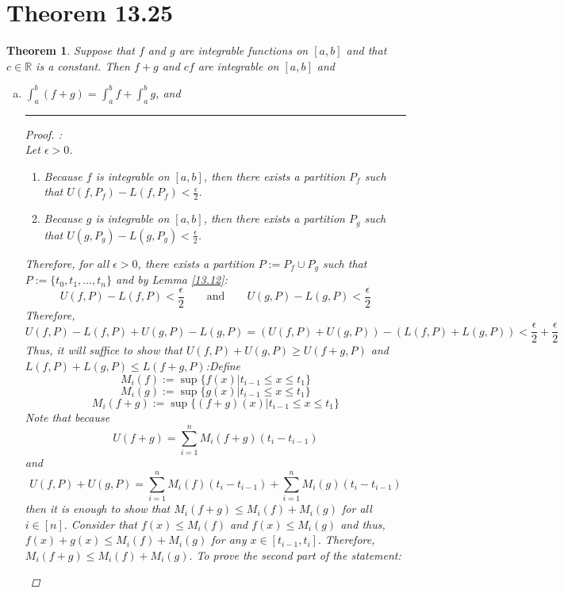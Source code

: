 \documentclass[openany, amssymb, psamsfonts]{amsart}
\newcommand{\bbR}{\mathbb{R}}
\newtheorem{thm}{Theorem}[section]
\theoremstyle{definition}
\numberwithin{equation}{section}
\begin{document}
\section*{Theorem 13.25}
\begin{thm}
\label{13.25}
	Suppose that $f$ and $g$ are integrable functions on $[a, b]$ and that $c \in \bbR$ is a constant. Then $f + g$ and $cf$ are integrable on $[a, b]$ and

	
	\begin{enumerate}[(a)]
		\item $\displaystyle \int_{a}^{b} (f + g) = \int_{a}^{b} f + \int_{a}^{b} g$, and
\vspace{4pt}     \hrule   \vspace{4pt} \begin{proof}:\\
Let $\epsilon>0$.
\begin{enumerate}
    \item Because $f$ is integrable on $[a,b]$, then there exists a partition $P_f$ such that $U(f,P_f) - L(f,P_f)< \frac{\epsilon}{2}$.
    \item Because $g$ is integrable on $[a,b]$, then there exists a partition $P_g$ such that $U(g,P_g) - L(g,P_g)< \frac{\epsilon}{2}$.
\end{enumerate}
Therefore, for all $\epsilon>0$, there exists a partition $P:= P_f \cup P_g$ such that $P:= \{t_0, t_1, \dots, t_n\}$ and by Lemma \ref{13.12}: \[U(f,P) - L(f,P)< \frac{\epsilon}{2} \qquad \text{and} \qquad U(g,P) - L(g,P)< \frac{\epsilon}{2}\] Therefore, \[U(f,P) - L(f,P) + U(g,P) - L(g,P)  = (U(f,P)+ U(g,P)) - (L(f,P)+ L(g,P))< \frac{\epsilon}{2} + \frac{\epsilon}{2}\] Thus, it will suffice to show that $U(f,P) + U(g,P) \geq U(f+g,P)$ and $L(f,P)+ L(g,P) \leq L(f+g, P)$:\newline Define \[M_i(f):= \sup\{f(x) | t_{i-1}\leq x \leq t_1\}\]
\[M_i(g):= \sup\{g(x) | t_{i-1}\leq x \leq t_1\}\]
\[M_i(f+g):= \sup\{(f+g)(x) | t_{i-1}\leq x \leq t_1\}\]
Note that because \[U(f+g) = \sum_{i=1}^nM_i(f+g)(t_i- t_{i-1})\] and \[U(f,P) + U(g,P) = \sum_{i=1}^nM_i(f)(t_i- t_{i-1}) + \sum_{i=1}^nM_i(g)(t_i- t_{i-1})\] then it is enough to show that $M_i(f+g)\leq M_i(f) + M_i(g)$ for all $i\in [n].$ Consider that $f(x)\leq M_i(f)$ and $f(x)\leq M_i(g)$ and thus, $f(x) + g(x)\leq M_i(f) + M_i(g)$ for any $x \in [t_{i-1}, t_i].$ Therefore, $M_i(f+g)\leq M_i(f) + M_i(g).$\newline\newline
To prove the second part of the statement:
\begin{enumerate}

\end{enumerate}
\end{proof}
\end{enumerate}
\end{thm}
\end{document}
